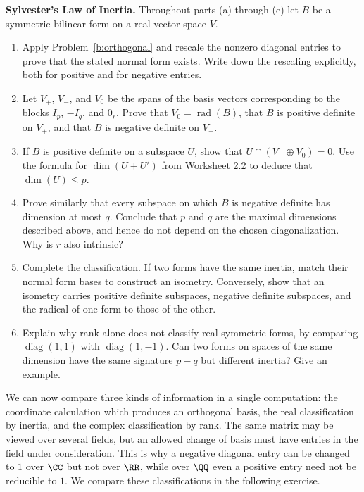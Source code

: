 \documentclass[12pt,reqno]{amsart}
\DeclareMathOperator{\rad}{rad}
\DeclareMathOperator{\diag}{diag}
\begin{document}
\begin{problems}
\item\label{b:sylvester} \textbf{Sylvester's Law of Inertia.} Throughout parts (a) through (e) let $B$ be a symmetric bilinear form on a real vector space $V$.
\begin{enumerate}
\item Apply Problem~\ref{b:orthogonal} and rescale the nonzero diagonal entries to prove that the stated normal form exists. Write down the rescaling explicitly, both for positive and for negative entries.
\item Let $V_+$, $V_-$, and $V_0$ be the spans of the basis vectors corresponding to the blocks $I_p$, $-I_q$, and $0_r$. Prove that $V_0=\rad(B)$, that $B$ is positive definite on $V_+$, and that $B$ is negative definite on $V_-$.
\item If $B$ is positive definite on a subspace $U$, show that $U\cap(V_-\oplus V_0)=0$. Use the formula for $\dim(U+U')$ from Worksheet 2.2 to deduce that $\dim(U)\leq p$.
\item Prove similarly that every subspace on which $B$ is negative definite has dimension at most $q$. Conclude that $p$ and $q$ are the maximal dimensions described above, and hence do not depend on the chosen diagonalization. Why is $r$ also intrinsic?
\item Complete the classification. If two forms have the same inertia, match their normal form bases to construct an isometry. Conversely, show that an isometry carries positive definite subspaces, negative definite subspaces, and the radical of one form to those of the other.
\item Explain why rank alone does not classify real symmetric forms, by comparing $\diag(1,1)$ with $\diag(1,-1)$. Can two forms on spaces of the same dimension have the same signature $p-q$ but different inertia? Give an example.
\end{enumerate}
\end{problems}

\hrulefill

We can now compare three kinds of information in a single computation: the coordinate calculation which produces an orthogonal basis, the real classification by inertia, and the complex classification by rank. The same matrix may be viewed over several fields, but an allowed change of basis must have entries in the field under consideration. This is why a negative diagonal entry can be changed to $1$ over $\CC$ but not over $\RR$, while over $\QQ$ even a positive entry need not be reducible to $1$. We compare these classifications in the following exercise.
\end{document}
